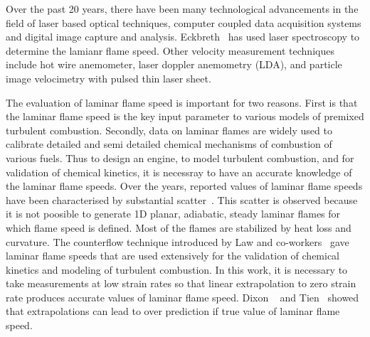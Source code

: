  Over the past 20 years, there have been many technological
advancements in the field of laser based optical techniques, computer
coupled data acquisition systems and digital image capture and
analysis. Eckbreth~\cite{eckbreth} has used laser spectroscopy to
determine the lamianr flame speed. Other velocity measurement
techniques include hot wire anemometer, laser doppler anemometry (LDA),
and particle image velocimetry with pulsed thin laser sheet.


 The evaluation of laminar flame speed is important for 
two reasons. First is that the laminar flame speed is the key
input parameter to various models of premixed turbulent
combustion. Secondly, data on laminar flames are widely used to calibrate
detailed and semi detailed chemical mechanisms of combustion of
various fuels. Thus to design an engine, to model turbulent combustion,
and for validation of chemical kinetics, it is necessray to have an
accurate knowledge of the laminar flame speeds. Over the years,
reported values of laminar flame speeds have been characterised by
substantial scatter~\cite{Andrew}. This scatter is observed because it
is not poosible to generate 1D planar, adiabatic, steady laminar
flames for which flame speed is defined. Most of the flames are
stabilized by heat loss and curvature. The counterflow technique
introduced by Law and co-workers~\cite{law} gave laminar flame speeds
that are used extensively for the validation of chemical kinetics and
modeling of turbulent combustion. In this work, it is necessary to
take measurements at low strain rates so that linear extrapolation to
zero strain rate produces accurate values of laminar flame
speed. Dixon ~\cite{dixon} and Tien~\cite{tien} showed that
extrapolations can lead to over prediction if true value of laminar
flame speed.
